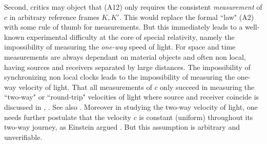 \documentclass[12pt]{article}
\begin{document}

Second, critics may object that (A12) only requires the consistent \emph{measurement} of $c$ in arbitrary reference frames $K, K'$. This would replace the formal ``law" (A2) with some rule of thumb for measurements. But this immediately leads to a well-known experimental difficulty at the core of special relativity, namely the impossibility of measuring the \emph{one-way} speed of light. For space and time measurements are always dependant on material objects and often non local, having sources and receivers separated by large distances. The impossibility of synchronizing non local clocks leads to the impossibility of measuring the one-way velocity of light. That all measurements of $c$ only succeed in measuring the ``two-way" or ``round-trip" velocities of light where source and receiver coincide is discussed in \cite{zhang1997special}, \cite{israel}. See also \cite{vid}. Moreover in studying the two-way velocity of light, one needs further postulate that the velocity $c$ is constant (uniform) throughout its two-way journey, as Einstein argued \cite[Ch.8]{einstein2019relativity}. But this assumption is arbitrary and unverifiable. %
\end{document}
